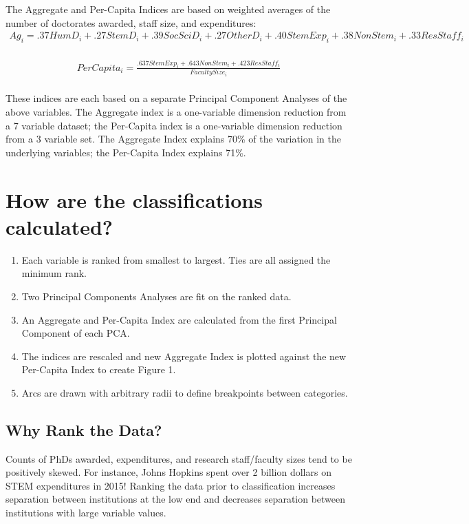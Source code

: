 \documentclass[a0,portrait]{a0poster}
\begin{document}
\begin{multicols}{2}
The Aggregate and Per-Capita Indices are based on weighted averages of the number of doctorates awarded, staff size, and expenditures: \\
\small
\begin{eqnarray}
 Ag_i = .37HumD_i + .27StemD_i + .39SocSciD_i + .27OtherD_i + .40StemExp_i + .38NonStem_i + .33ResStaff_i 
\label{eqn:Aggregate Index}
\end{eqnarray}
\\
\begin{eqnarray}
PerCapita_i = \frac{.637StemExp_i + .643NonStem_i + .423ResStaff_i}{FacultySize_i} 
\end{eqnarray}
\\
These indices are each based on a separate Principal Component Analyses of the above variables. The Aggregate index is a one-variable dimension reduction from a 7 variable dataset; the Per-Capita index is a one-variable dimension reduction from a 3 variable set. The Aggregate Index explains 70\% of the variation in the underlying variables; the Per-Capita Index explains 71\%. 

\section*{How are the classifications calculated?}

\begin{enumerate}
\item Each variable is ranked from smallest to largest. Ties are all assigned the minimum rank.
\item Two Principal Components Analyses are fit on the ranked data.
\item An Aggregate and Per-Capita Index are calculated from the first Principal Component of each PCA.
\item The indices are rescaled and new Aggregate Index is plotted against the new Per-Capita Index to create Figure 1.
\item Arcs are drawn with arbitrary radii to define breakpoints between categories.
 
\end{enumerate}

\subsection*{Why Rank the Data?}
Counts of PhDs awarded, expenditures, and research staff/faculty sizes tend to be positively skewed. For instance, Johns Hopkins spent over 2 billion dollars on STEM expenditures in 2015!  Ranking the data prior to classification increases separation between institutions at the low end and decreases separation between institutions with large variable values. 


\end{multicols}
\end{document}
